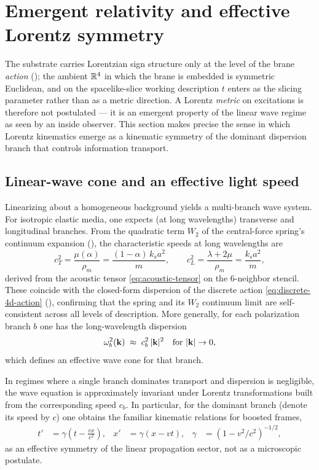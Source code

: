 \section{Emergent relativity and effective Lorentz symmetry}
\label{sec:emergent-relativity}

The substrate carries Lorentzian sign structure only at the level of the brane \emph{action} (); the ambient $\mathbb{R}^4$ in which the brane is embedded is symmetric Euclidean, and on the spacelike-slice working description $t$ enters as the slicing parameter rather than as a metric direction.
A Lorentz \emph{metric} on excitations is therefore not postulated --- it is an emergent property of the linear wave regime as seen by an inside observer.
This section makes precise the sense in which Lorentz kinematics emerge as a kinematic symmetry of the dominant dispersion branch that controls information transport.

\subsection{Linear-wave cone and an effective light speed}

Linearizing  about a homogeneous background yields a multi-branch wave system.
For isotropic elastic media, one expects (at long wavelengths) transverse and longitudinal branches.
From the quadratic term $W_2$ of the central-force spring's continuum expansion
(), the characteristic speeds at long wavelengths are
\begin{equation}
  c_T^2 = \frac{\mu(\alpha)}{\rho_m} = \frac{(1-\alpha)\,k_s a^2}{m},
  \qquad
  c_L^2 = \frac{\lambda+2\mu}{\rho_m} = \frac{k_s a^2}{m},
  \label{eq:cl-ct}
\end{equation}
derived from the acoustic tensor \eqref{eq:acoustic-tensor} on the 6-neighbor stencil.
These coincide with the closed-form dispersion of the discrete action \eqref{eq:discrete-4d-action}
(), confirming that the spring and its $W_2$ continuum limit are
self-consistent across all levels of description.
More generally, for each polarization branch $b$ one has the long-wavelength dispersion
\begin{equation}
  \omega_b^2(\mathbf{k})\;\approx\; c_b^2\,|\mathbf{k}|^2 \quad \text{for } |\mathbf{k}|\to 0,
  \label{eq:linear-dispersion}
\end{equation}
which defines an effective wave cone for that branch.

In regimes where a single branch dominates transport and dispersion is negligible,
the wave equation is approximately invariant under Lorentz transformations built from the corresponding
speed $c_b$. In particular, for the dominant branch (denote its speed by $c$) one obtains the familiar
kinematic relations for boosted frames,
\begin{align}
t' &= \gamma\left(t-\frac{vx}{c^2}\right),&
x' &= \gamma(x-vt),&
\gamma &= (1-v^2/c^2)^{-1/2},
\label{eq:lorentz}
\end{align}
as an effective symmetry of the linear propagation sector, not as a microscopic postulate.


